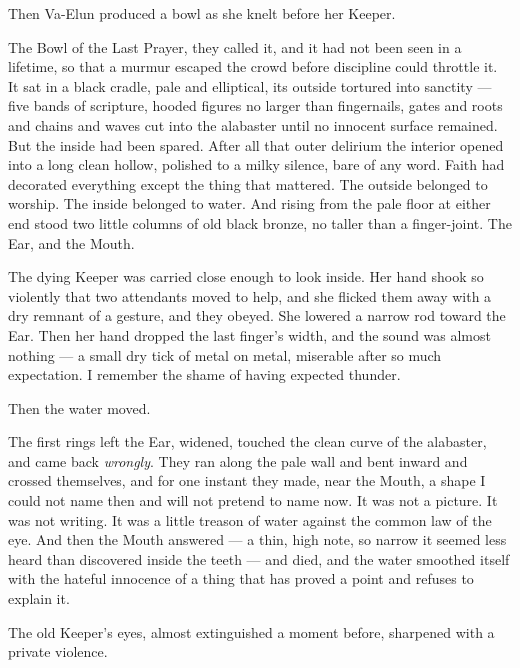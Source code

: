 Then Va-Elun produced a bowl as she knelt before her Keeper.\par

The Bowl of the Last Prayer, they called it, and it had not been seen in a lifetime, so that a murmur escaped the crowd before discipline could throttle it. 
It sat in a black cradle, pale and elliptical, its outside tortured into sanctity --- five bands of scripture, hooded figures no larger than fingernails, 
gates and roots and chains and waves cut into the alabaster until no innocent surface remained. 
But the inside had been spared. 
After all that outer delirium the interior opened into a long clean hollow, polished to a milky silence, bare of any word. 
Faith had decorated everything except the thing that mattered. 
The outside belonged to worship. 
The inside belonged to water. 
And rising from the pale floor at either end stood two little columns of old black bronze, no taller than a finger-joint. 
The Ear, and the Mouth.\par

The dying Keeper was carried close enough to look inside. 
Her hand shook so violently that two attendants moved to help, and she flicked them away with a dry remnant of a gesture, and they obeyed. 
She lowered a narrow rod toward the Ear. 
Then her hand dropped the last finger's width, and the sound was almost nothing --- a small dry tick of metal on metal, miserable after so much expectation. 
I remember the shame of having expected thunder.\par

Then the water moved.\par

The first rings left the Ear, widened, touched the clean curve of the alabaster, and came back \textit{wrongly}. 
They ran along the pale wall and bent inward and crossed themselves, and for one instant they made, near the Mouth, a shape I could not name then and will not pretend to name now. 
It was not a picture. 
It was not writing. 
It was a little treason of water against the common law of the eye. 
And then the Mouth answered --- a thin, high note, so narrow it seemed less heard than discovered inside the teeth --- and died, and the water smoothed 
itself with the hateful innocence of a thing that has proved a point and refuses to explain it.\par

The old Keeper's eyes, almost extinguished a moment before, sharpened with a private violence.\par


